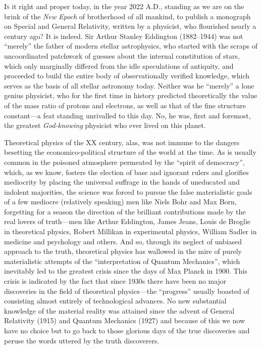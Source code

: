 \documentclass[12pt]{book}
\begin{document}

\lettrine{\textcolor{lettrinecolour}{I}}{s} it right and proper today, in the year 2022 A.D., standing as we are on the brink of the
\emph{New Epoch} of brotherhood of all mankind,
to publish a monograph on Special and General Relativity, written by a physicist,
who flourished nearly a century ago?
It is indeed.
Sir Arthur Stanley Eddington (1882--1944) was not ``merely'' the father of modern stellar astrophysics, who started with the
scraps of uncoordinated patchwork of guesses about the internal constitution of stars, which only marginally
differed from the idle speculations of antiquity, and proceeded to build the entire body of
observationally verified knowledge, which serves as the basis of all stellar astronomy today.
Neither was he ``merely'' a lone genius physicist, who for the first time in history predicted
theoretically the value of the mass ratio of protons and electrons, as well as that of the fine
structure constant---a feat standing unrivalled to this day.
No, he was, first and foremost, the greatest \emph{God\hyp{}knowing} physicist who ever lived on this planet.

Theoretical physics of the XX century, alas, was not immune to the dangers besetting the economico\hyp{}political
structure of the world at the time.
As is usually common in the poisoned atmosphere permeated by the ``spirit of democracy'',
which, as we know, fosters the election of base and ignorant rulers and glorifies mediocrity by placing the
universal suffrage in the hands of uneducated and indolent majorities, the science was forced to pursue the false
materialistic goals of a few mediocre (relatively speaking) men like Niels Bohr and Max Born, forgetting for a season
the direction of the brilliant contributions made by the real lovers of truth---men like Arthur Eddington,
James Jeans, Louis de Broglie in theoretical physics,
Robert Millikan in experimental physics, William Sadler in medicine and psychology and others.
And so, through its neglect of unbiased approach to the truth, theoretical physics has wallowed
in the mire of purely materialistic attempts of the ``interpretation of Quantum Mechanics'',
which inevitably led to the greatest crisis since the days of Max Planck in 1900.
This crisis is indicated by the fact that since 1930s there have been no major discoveries in the field of
theoretical physics---the ``progress'' usually boasted of consisting almost entirely of technological advances.
No new substantial knowledge of the material reality was attained since the advent of General Relativity (1915)
and Quantum Mechanics (1927) and because of this we now have no choice but to go back to those glorious days
of the true discoveries and peruse the words uttered by the truth discoverers.
\end{document}
